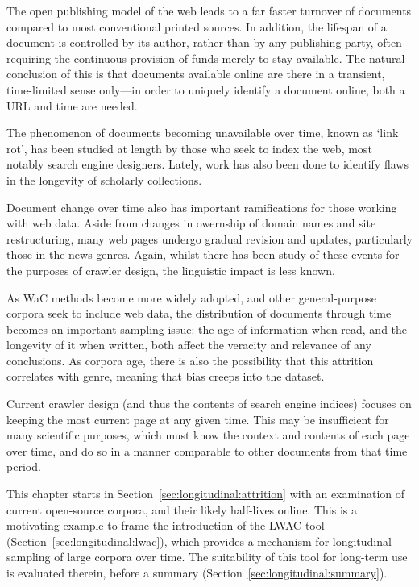 The open publishing model of the web leads to a far faster turnover of documents compared to most conventional printed sources.  In addition, the lifespan of a document is controlled by its author, rather than by any publishing party, often requiring the continuous provision of funds merely to stay available.  The natural conclusion of this is that documents available online are there in a transient, time-limited sense only---in order to uniquely identify a document online, both a URL and time are needed.

The phenomenon of documents becoming unavailable over time, known as `link rot', has been studied at length by those who seek to index the web, most notably search engine designers.  Lately, work has also been done to identify flaws in the longevity of scholarly collections\cite{101371journalpone0115253}.

Document change over time also has important ramifications for those working with web data.  Aside from changes in owernship of domain names and site restructuring, many web pages undergo gradual revision and updates, particularly those in the news genres.  Again, whilst there has been study of these events for the purposes of crawler design, the linguistic impact is less known.

As WaC methods become more widely adopted, and other general-purpose corpora seek to include web data, the distribution of documents through time becomes an important sampling issue: the age of information when read, and the longevity of it when written, both affect the veracity and relevance of any conclusions.  As corpora age, there is also the possibility that this attrition correlates with genre, meaning that bias creeps into the dataset.

Current crawler design (and thus the contents of search engine indices) focuses on keeping the most current page at any given time.  This may be insufficient for many scientific purposes, which must know the context and contents of each page over time, and do so in a manner comparable to other documents from that time period.

This chapter starts in Section~\ref{sec:longitudinal:attrition} with an examination of current open-source corpora, and their likely half-lives online.  This is a motivating example to frame the introduction of the LWAC tool (Section~\ref{sec:longitudinal:lwac}), which provides a mechanism for longitudinal sampling of large corpora over time.  The suitability of this tool for long-term use is evaluated therein, before a summary (Section~\ref{sec:longitudinal:summary}).


